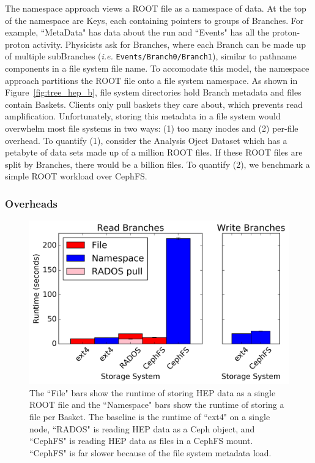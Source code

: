 The namespace approach views a ROOT file as a namespace of data. At the top of
the namespace are Keys, each containing pointers to groups of Branches. For
example, ``MetaData" has data about the run and ``Events" has all the
proton-proton activity. Physicists ask for Branches, where each Branch can be
made up of multiple subBranches ({\it i.e.} \texttt{Events/Branch0/Branch1}),
similar to pathname components in a file system file name.  To accomodate this
model, the namespace approach partitions the ROOT file onto a file system
namespace.  As shown in Figure~\ref{fig:tree_hep_b}, file system directories
hold Branch metadata and files contain Baskets. Clients only pull baskets
they care about, which prevents read amplification.  Unfortunately, storing
this metadata in a file system would overwhelm most file systems in two ways:
(1) too many inodes and (2) per-file overhead.  To quantify (1), consider the
Analysis Oject Dataset which has a petabyte of data sets made up of a million
ROOT files. If these ROOT files are split by Branches, there would be a billion
files. To quantify (2), we benchmark a simple ROOT workload over CephFS.


\subsubsection{Overheads}

\begin{figure}[tb]
\centering
  \includegraphics[width=1\linewidth]{figures/hep_runtime.png}
  \caption{The ``File" bars show the runtime of storing HEP data as a single
ROOT file and the ``Namespace" bars show the runtime of storing a file per
Basket. The baseline is the runtime of ``ext4" on a single node, ``RADOS" is
reading HEP data as a Ceph object, and ``CephFS" is reading HEP data as files
in a CephFS mount. ``CephFS" is far slower because of the file system metadata
load.}
  \label{fig:hep_runtime}
\end{figure}

